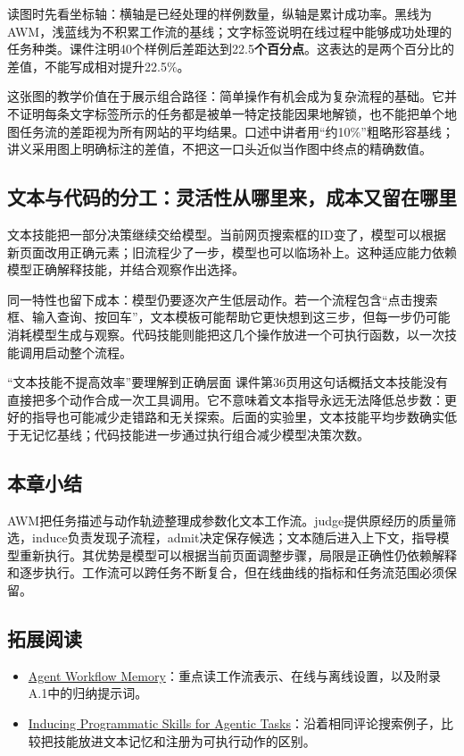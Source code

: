 \documentclass[11pt,a4paper]{article}
\begin{document}
读图时先看坐标轴：横轴是已经处理的样例数量，纵轴是累计成功率。黑线为AWM，浅蓝线为不积累工作流的基线；文字标签说明在线过程中能够成功处理的任务种类。课件注明40个样例后差距达到22.5\textbf{个百分点}。这表达的是两个百分比的差值，不能写成相对提升22.5\%。

这张图的教学价值在于展示组合路径：简单操作有机会成为复杂流程的基础。它并不证明每条文字标签所示的任务都是被单一特定技能因果地解锁，也不能把单个地图任务流的差距视为所有网站的平均结果。口述中讲者用“约10\%”粗略形容基线；讲义采用图上明确标注的差值，不把这一口头近似当作图中终点的精确数值。

\subsection{文本与代码的分工：灵活性从哪里来，成本又留在哪里}
文本技能把一部分决策继续交给模型。当前网页搜索框的ID变了，模型可以根据新页面改用正确元素；旧流程少了一步，模型也可以临场补上。这种适应能力依赖模型正确解释技能，并结合观察作出选择。

同一特性也留下成本：模型仍要逐次产生低层动作。若一个流程包含“点击搜索框、输入查询、按回车”，文本模板可能帮助它更快想到这三步，但每一步仍可能消耗模型生成与观察。代码技能则能把这几个操作放进一个可执行函数，以一次技能调用启动整个流程。

\begin{warningbox}{“文本技能不提高效率”要理解到正确层面}
课件第36页用这句话概括文本技能没有直接把多个动作合成一次工具调用。它不意味着文本指导永远无法降低总步数：更好的指导也可能减少走错路和无关探索。后面的实验里，文本技能平均步数确实低于无记忆基线；代码技能进一步通过执行组合减少模型决策次数。
\end{warningbox}

\subsection{本章小结}
AWM把任务描述与动作轨迹整理成参数化文本工作流。judge提供原经历的质量筛选，induce负责发现子流程，admit决定保存候选；文本随后进入上下文，指导模型重新执行。其优势是模型可以根据当前页面调整步骤，局限是正确性仍依赖解释和逐步执行。工作流可以跨任务不断复合，但在线曲线的指标和任务流范围必须保留。

\subsection{拓展阅读}
\begin{itemize}
\item \href{https://arxiv.org/abs/2409.07429}{Agent Workflow Memory}：重点读工作流表示、在线与离线设置，以及附录A.1中的归纳提示词。
\item \href{https://arxiv.org/abs/2504.06821}{Inducing Programmatic Skills for Agentic Tasks}：沿着相同评论搜索例子，比较把技能放进文本记忆和注册为可执行动作的区别。
\end{itemize}
\end{document}
